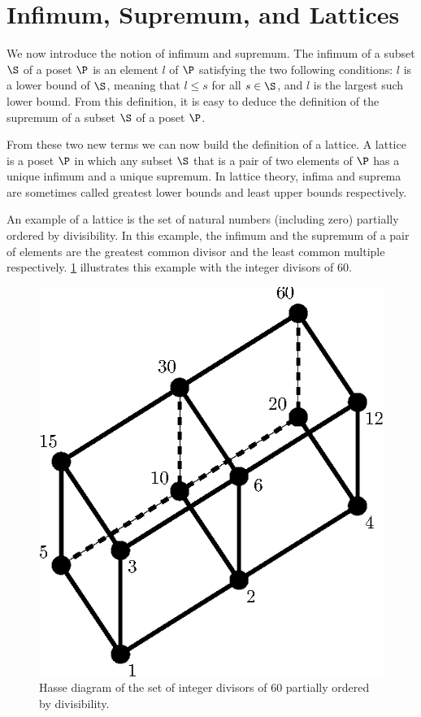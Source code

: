 \section{Infimum, Supremum, and Lattices}
\label{tree:poset:lattices}

We now introduce the notion of infimum and supremum. The infimum of a
subset \(\S\) of a poset \(\P\) is an element \(l\) of \(\P\) satisfying the two
following conditions: \(l\) is a lower bound of \(\S\), meaning that \(l \le
s\) for all \(s \in \S\), and \(l\) is the largest such lower bound. From this
definition, it is easy to deduce the definition of the supremum of a subset
\(\S\) of a poset \(\P\).

From these two new terms we can now build the definition of a lattice. A
lattice is a poset \(\P\) in which any subset \(\S\) that is a pair of two
elements of \(\P\) has a unique infimum and a unique supremum. In lattice
theory, infima and suprema are sometimes called greatest lower bounds and least
upper bounds respectively.

An example of a lattice is the set of natural numbers (including zero)
partially ordered by divisibility. In this example, the infimum and the
supremum of a pair of elements are the greatest common divisor and the least
common multiple respectively. \ref{fig:poset:lattice:60div} illustrates this
example with the integer divisors of \(60\).

\begin{figure}
\center
\includegraphics[height=0.2\textheight]{fig/poset/lattice/60div}
\caption{Hasse diagram of the set of integer divisors of \(60\) partially ordered by
divisibility.}\label{fig:poset:lattice:60div}
\end{figure}
